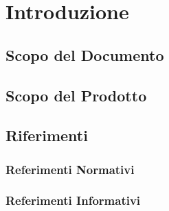 \section{Introduzione}\label{Intro}

\subsection{Scopo del Documento}


\subsection{Scopo del Prodotto}


\subsection{Riferimenti}\label{Riferimenti}
\subsubsection{Referimenti Normativi}


\subsubsection{Referimenti Informativi}
